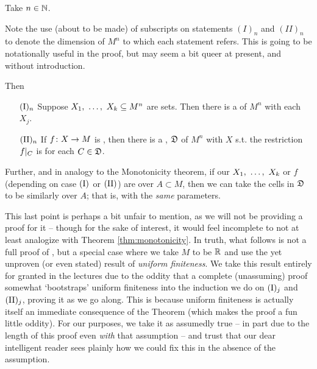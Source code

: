 \begin{theorem}[\CD]
  \label{thm:cell-decomposition}
  Take $n \in \N$.
  \begin{svgraybox}
    Note the use (about to be made) of subscripts on statements $(I)_n$ and $(II)_n$ to denote the dimension of $M^n$ to which each statement refers. This is going to be notationally useful in the proof, but may seem a bit queer at present, and without introduction.
  \end{svgraybox}
 Then
  \begin{enumerate}[label={}]
    \item[$\In$ ] Suppose $\vonevm{X}{k} \subseteq M^n$ are  sets. Then there is a \cd of $M^n$ \cmptble with each $X_j$.
    \item[$\IIn$ ] If $\funcdom{f}{X}{M}$ is , then there is a \cd, $\fancyD$ of $M^n$ \cmptble with $X$ s.t. the restriction $\funcrestr{f}{C}$ is \cont for each $C \in \fancyD$.
  \end{enumerate}

  Further, and in analogy to the Monotonicity theorem, if our $\vonevm{X}{k}$ or $f$ (depending on case $\In[]$ or $\IIn[]$) are  over $A \subset M$, then we can take the cells in  $\fancyD$ to be similarly  over $A$; that is, with the \emph{same} parameters.

  \begin{svgraybox}
    This last point is perhaps a bit unfair to mention, as we will not be providing a proof for it -- though for the sake of interest, it would feel incomplete to not at least analogize with Theorem \ref{thm:monotonicity}. In truth, what follows is not a full proof of \CD, but a special case where we take $M$ to be $\R$ and use the yet unproven (or even stated) result of \emph{uniform finiteness}. We take this result entirely for granted in the lectures due to the oddity that a complete (unassuming) proof somewhat `bootstraps' uniform finiteness into the induction we do on $\In[j]$ and $\IIn[j]$, proving it as we go along. This is because uniform finiteness is actually itself an immediate consequence of the \CD Theorem (which makes the proof a fun little oddity). For our purposes, we take it as assumedly true -- in part due to the length of this proof even \emph{with} that assumption -- and trust that our dear intelligent reader sees plainly how we could fix this in the absence of the assumption.
  \end{svgraybox}

\end{theorem}

